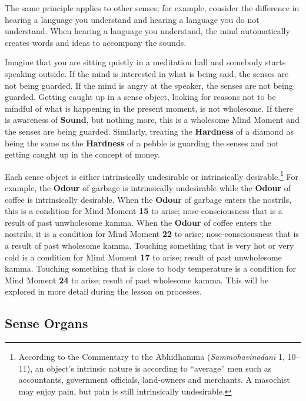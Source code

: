 The same principle applies to other senses; for example, consider the difference in hearing a language you understand and hearing a language you do not understand. When hearing a language you understand, the mind automatically creates words and ideas to accompany the sounds.

Imagine that you are sitting quietly in a meditation hall and somebody starts speaking outside. If the mind is interested in what is being said, the senses are not being guarded. If the mind is angry at the speaker, the senses are not being guarded. Getting caught up in a sense object, looking for reasons not to be mindful of what is happening in the present moment, is not wholesome. If there is awareness of \textbf{Sound}, but nothing more, this is a wholesome Mind Moment and the senses are being guarded. Similarly, treating the \textbf{Hardness} of a diamond as being the same as the \textbf{Hardness} of a pebble is guarding the senses and not getting caught up in the concept of money.

Each sense object is either intrinsically undesirable or intrinsically desirable.\footnote{According to the Commentary to the Abhidhamma (\textit{Sammohavinodanī} 1, 10--11), an object’s intrinsic nature is according to “average” men such as accountants, government officials, land-owners and merchants. A masochist may enjoy pain, but pain is still intrinsically undesirable.} For example, the \textbf{Odour} of garbage is intrinsically undesirable while the \textbf{Odour} of coffee is intrinsically desirable. When the \textbf{Odour} of garbage enters the nostrils, this is a condition for Mind Moment \textbf{15} to arise; nose-consciousness that is a result of past unwholesome kamma. When the \textbf{Odour} of coffee enters the nostrils, it is a condition for Mind Moment \textbf{22} to arise; nose-consciousness that is a result of past wholesome kamma. Touching something that is very hot or very cold is a condition for Mind Moment \textbf{17} to arise; result of past unwholesome kamma. Touching something that is close to body temperature is a condition for Mind Moment \textbf{24} to arise; result of past wholesome kamma. This will be explored in more detail during the lesson on processes.

\subsection*{Sense Organs}

